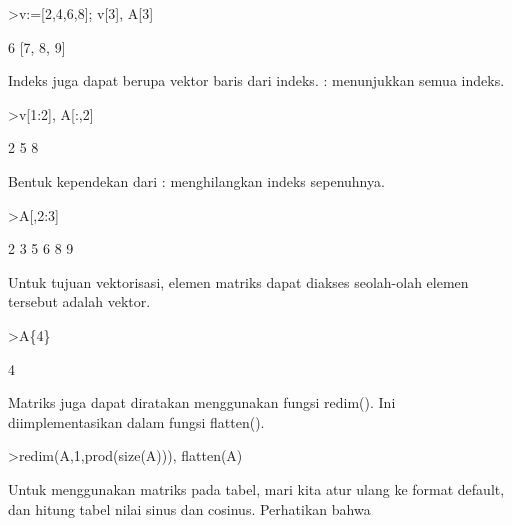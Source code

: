 \documentclass{article}
\begin{document}
\begin{eulernotebook}
\begin{eulercomment}
\begin{eulercomment}
\begin{eulercomment}
\begin{eulercomment}
\begin{eulercomment}
\begin{eulercomment}
\begin{eulercomment}
\end{eulercomment}
\begin{eulerprompt}
>v:=[2,4,6,8]; v[3], A[3]
\end{eulerprompt}
\begin{euleroutput}
  6
  [7,  8,  9]
\end{euleroutput}
\begin{eulercomment}
Indeks juga dapat berupa vektor baris dari indeks. : menunjukkan semua
indeks.
\end{eulercomment}
\begin{eulerprompt}
>v[1:2], A[:,2]
\end{eulerprompt}
\begin{euleroutput}
  [2,  4]
              2 
              5 
              8 
\end{euleroutput}
\begin{eulercomment}
Bentuk kependekan dari : menghilangkan indeks sepenuhnya.
\end{eulercomment}
\begin{eulerprompt}
>A[,2:3]
\end{eulerprompt}
\begin{euleroutput}
              2             3 
              5             6 
              8             9 
\end{euleroutput}
\begin{eulercomment}
Untuk tujuan vektorisasi, elemen matriks dapat diakses seolah-olah
elemen tersebut adalah vektor.
\end{eulercomment}
\begin{eulerprompt}
>A\{4\}
\end{eulerprompt}
\begin{euleroutput}
  4
\end{euleroutput}
\begin{eulercomment}
Matriks juga dapat diratakan menggunakan fungsi redim(). Ini
diimplementasikan dalam fungsi flatten().
\end{eulercomment}
\begin{eulerprompt}
>redim(A,1,prod(size(A))), flatten(A)
\end{eulerprompt}
\begin{euleroutput}
  [1,  2,  3,  4,  5,  6,  7,  8,  9]
  [1,  2,  3,  4,  5,  6,  7,  8,  9]
\end{euleroutput}
\begin{eulercomment}
Untuk menggunakan matriks pada tabel, mari kita atur ulang ke format
default, dan hitung tabel nilai sinus dan cosinus. Perhatikan bahwa

\end{eulercomment}
\end{eulercomment}
\end{eulercomment}
\end{eulercomment}
\end{eulercomment}
\end{eulercomment}
\end{eulercomment}
\end{eulernotebook}
\end{document}
